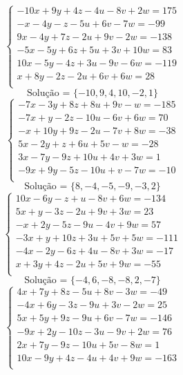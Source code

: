 \documentclass[12pt,oneside,a4paper]{article}
\begin{document}
\vspace{\baselineskip}
\begin{equation*}
\begin{cases}
-10x+9y+4z-4u-8v+2w=175 \\
-x-4y-z-5u+6v-7w=-99 \\
9x-4y+7z-2u+9v-2w=-138 \\
-5x-5y+6z+5u+3v+10w=83 \\
10x-5y-4z+3u-9v-6w=-119 \\
x+8y-2z-2u+6v+6w=28 \\
\end{cases}
\end{equation*}
\begin{equation*}
\text{Solução = }\{-10,9,4,10,-2,1\}
\end{equation*}
\vspace{\baselineskip}
\begin{equation*}
\begin{cases}
-7x-3y+8z+8u+9v-w=-185 \\
-7x+y-2z-10u-6v+6w=70 \\
-x+10y+9z-2u-7v+8w=-38 \\
5x-2y+z+6u+5v-w=-28 \\
3x-7y-9z+10u+4v+3w=1 \\
-9x+9y-5z-10u+v-7w=-10 \\
\end{cases}
\end{equation*}
\begin{equation*}
\text{Solução = }\{8,-4,-5,-9,-3,2\}
\end{equation*}
\vspace{\baselineskip}
\begin{equation*}
\begin{cases}
10x-6y-z+u-8v+6w=-134 \\
5x+y-3z-2u+9v+3w=23 \\
-x+2y-5z-9u-4v+9w=57 \\
-3x+y+10z+3u+5v+5w=-111 \\
-4x-2y-6z+4u-8v+3w=-17 \\
x+3y+4z-2u+5v+9w=-55 \\
\end{cases}
\end{equation*}
\begin{equation*}
\text{Solução = }\{-4,6,-8,-8,2,-7\}
\end{equation*}
\vspace{\baselineskip}
\begin{equation*}
\begin{cases}
4x+7y+8z-5u+8v-3w=-49 \\
-4x+6y-3z-9u+3v-2w=25 \\
5x+5y+9z-9u+6v-7w=-146 \\
-9x+2y-10z-3u-9v+2w=76 \\
2x+7y-9z-10u+5v-8w=1 \\
10x-9y+4z-4u+4v+9w=-163 \\
\end{cases}
\end{equation*}
\end{document}

